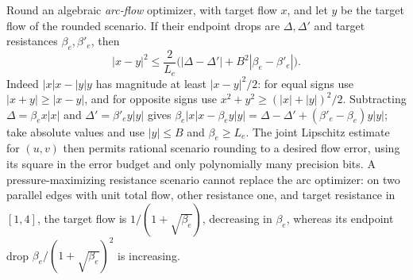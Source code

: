 \begin{remark}
\label{rem:a-blk-arc-witness}
Round an algebraic \emph{arc-flow} optimizer, with target flow $x$,
and let $y$ be the target flow of the rounded scenario. If their endpoint
drops are $\Delta,\Delta'$ and target resistances $\beta_e,\beta'_e$,
then
\[
 |x-y|^2\le
 \frac{2}{L_e}\bigl(|\Delta-\Delta'|+B^2|\beta_e-\beta'_e|\bigr).
\]
Indeed $|x|x-|y|y$ has magnitude at least $|x-y|^2/2$: for equal signs
use $|x+y|\ge|x-y|$, and for opposite signs use
$x^2+y^2\ge(|x|+|y|)^2/2$.
Subtracting $\Delta=\beta_ex|x|$ and
$\Delta'=\beta'_ey|y|$ gives
$\beta_e|x|x-\beta_ey|y|=\Delta-\Delta'+(\beta'_e-\beta_e)y|y|$;
take absolute values and use $|y|\le B$ and $\beta_e\ge L_e$.
The joint Lipschitz estimate for $(u,v)$ then permits rational scenario
rounding to a desired flow error, using its square in the error budget
and only polynomially many precision bits.
A pressure-maximizing resistance scenario cannot replace the arc
optimizer: on two parallel edges with unit total flow, other resistance
one, and target resistance in $[1,4]$, the target flow is
$1/(1+\sqrt{\beta_e})$, decreasing in $\beta_e$, whereas its endpoint
drop $\beta_e/(1+\sqrt{\beta_e})^2$ is increasing.
\end{remark}

